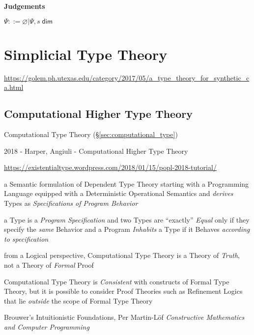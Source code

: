 \textbf{Judgements}

$\Psi ::= \varnothing | \Psi, s \;\mathsf{dim}$



\section{Simplicial Type Theory}\label{sec:simplicial_type_theory}

\url{https://golem.ph.utexas.edu/category/2017/05/a_type_theory_for_synthetic_ca.html}



\subsection{Computational Higher Type Theory}
\label{sec:computational_higher_type_theory}

\fist Computational Type Theory (\S\ref{sec:computational_type})

2018 - Harper, Angiuli - Computational Higher Type Theory

\url{https://existentialtype.wordpress.com/2018/01/15/popl-2018-tutorial/}

a Semantic formulation of Dependent Type Theory starting with a Programming
Language equipped with a Deterministic Operational Semantics and \emph{derives}
Types as \emph{Specifications of Program Behavior}

a Type is a \emph{Program Specification} and two Types are ``exactly''
\emph{Equal} only if they specify the \emph{same} Behavior and a Program
\emph{Inhabits} a Type if it Behaves \emph{according to specification}

from a Logical perspective, Computational Type Theory is a Theory of
\emph{Truth}, not a Theory of \emph{Formal} Proof

Computational Type Theory is \emph{Consistent} with constructs of Formal Type
Theory, but it is possible to consider Proof Theories such as Refinement Logics
that lie \emph{outside} the scope of Formal Type Theory

Brouwer's Intuitionistic Foundations, Per Martin-L\"of \emph{Constructive
  Mathematics and Computer Programming}


